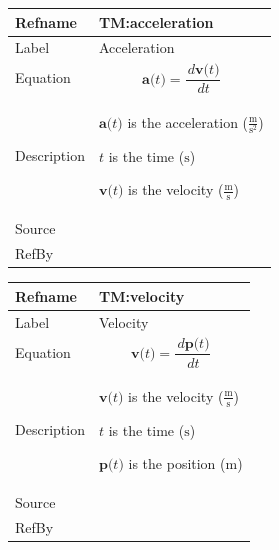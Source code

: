 \documentclass[12pt]{article}
\begin{document}
\vspace{\baselineskip}
\noindent
\begin{minipage}{\textwidth}
\begin{tabular}{>{\raggedright}p{}>{\raggedright\arraybackslash}p{}}
\toprule \textbf{Refname} & \textbf{TM:acceleration}
\label{TM:acceleration}
\\ \midrule
Label & Acceleration
        
\\ \midrule
Equation & \begin{displaymath}
           \symbf{a}\text{(}t\text{)}=\frac{\,d\symbf{v}\text{(}t\text{)}}{\,dt}
           \end{displaymath}
\\ \midrule
Description & \begin{symbDescription}
              \item{$\symbf{a}\text{(}t\text{)}$ is the acceleration ($\frac{\text{m}}{\text{s}^{2}}$)}
              \item{$t$ is the time (${\text{s}}$)}
              \item{$\symbf{v}\text{(}t\text{)}$ is the velocity ($\frac{\text{m}}{\text{s}}$)}
              \end{symbDescription}
\\ \midrule
Source & \cite{accelerationWiki}
         
\\ \midrule
RefBy & 
\\ \bottomrule
\end{tabular}
\end{minipage}
\vspace{\baselineskip}
\noindent
\begin{minipage}{\textwidth}
\begin{tabular}{>{\raggedright}p{}>{\raggedright\arraybackslash}p{}}
\toprule \textbf{Refname} & \textbf{TM:velocity}
\label{TM:velocity}
\\ \midrule
Label & Velocity
        
\\ \midrule
Equation & \begin{displaymath}
           \symbf{v}\text{(}t\text{)}=\frac{\,d\symbf{p}\text{(}t\text{)}}{\,dt}
           \end{displaymath}
\\ \midrule
Description & \begin{symbDescription}
              \item{$\symbf{v}\text{(}t\text{)}$ is the velocity ($\frac{\text{m}}{\text{s}}$)}
              \item{$t$ is the time (${\text{s}}$)}
              \item{$\symbf{p}\text{(}t\text{)}$ is the position (${\text{m}}$)}
              \end{symbDescription}
\\ \midrule
Source & \cite{velocityWiki}
         
\\ \midrule
RefBy & 
\\ \bottomrule
\end{tabular}
\end{minipage}
\end{document}
